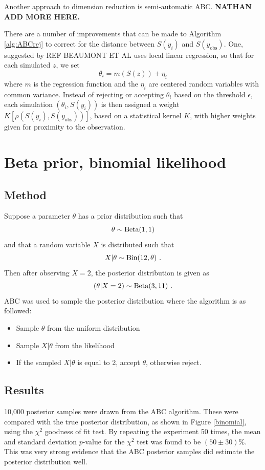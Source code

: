 \documentclass[a4paper,10pt]{article}
\begin{document}
Another approach to dimension reduction is semi-automatic ABC. \textbf{NATHAN ADD MORE HERE.}

There are a number of improvements that can be made to Algorithm \ref{alg:ABCrej} to correct for the distance between $S(y_i)$ and $S(y_\textrm{obs})$. One, suggested by REF BEAUMONT ET AL uses local linear regression, so that for each simulated $z$, we set 
\[
\theta_i = m(S(z)) + \eta_i
\]
where $m$ is the regression function and the $\eta_i$ are centered random variables with common variance. Instead of rejecting or accepting $\theta_i$ based on the threshold $\epsilon$, each simulation $(\theta_i, S(y_i))$ is then assigned a weight $K[\rho(S(y_i), S(y_\textrm{obs}))]$, based on a statistical kernel $K$, with higher weights given for proximity to the observation. 

\section{Beta prior, binomial likelihood} \label{sec:beta-bin}
\subsection{Method}
Suppose a parameter $\theta$ has a prior distribution such that
\begin{equation}
\theta\sim\textup{Beta}(1,1)
\end{equation}
and that a random variable $X$ is distributed such that
\begin{equation}
X|\theta\sim\textup{Bin}(12,\theta) \ .
\end{equation}
Then after observing $X=2$, the posterior distribution is given as
\begin{equation}
(\theta|X=2)\sim\textup{Beta}(3,11) \ .
\end{equation}
ABC was used to sample the posterior distribution where the algorithm is as followed:
\begin{itemize}
  \item Sample $\theta$ from the uniform distribution
  \item Sample $X|\theta$ from the likelihood
  \item If the sampled $X|\theta$ is equal to 2, accept $\theta$, otherwise reject.
\end{itemize}

\subsection{Results}
10,000 posterior samples were drawn from the ABC algorithm. These were compared with the true posterior distribution, as shown in Figure \ref{binomial}, using the $\chi^2$ goodness of fit test.  By repeating the experiment 50 times, the mean and standard deviation $p$-value for the $\chi^2$ test was found to be $(50\pm30)\%$. This was very strong evidence that the ABC posterior samples did estimate the posterior distribution well.
\end{document}
